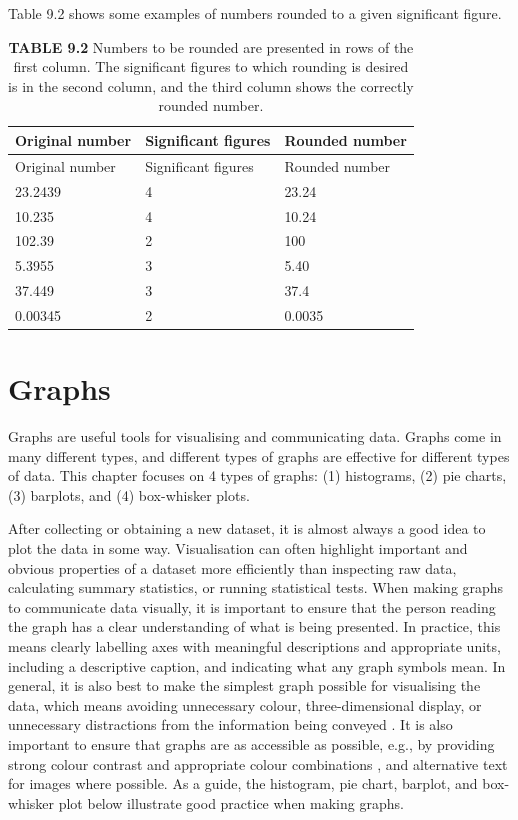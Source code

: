 \documentclass[
  openany]{krantz}
\begin{document}
Table 9.2 shows some examples of numbers rounded to a given significant figure.

\begin{longtable}[]{@{}lll@{}}
\caption{\textbf{TABLE 9.2} Numbers to be rounded are presented in rows of the first column. The significant figures to which rounding is desired is in the second column, and the third column shows the correctly rounded number.}\tabularnewline
\toprule
Original number & Significant figures & Rounded number \\
\midrule
\endfirsthead
\toprule
Original number & Significant figures & Rounded number \\
\midrule
\endhead
23.2439 & 4 & 23.24 \\
10.235 & 4 & 10.24 \\
102.39 & 2 & 100 \\
5.3955 & 3 & 5.40 \\
37.449 & 3 & 37.4 \\
0.00345 & 2 & 0.0035 \\
\bottomrule
\end{longtable}

\hypertarget{Chapter_10}{%
\chapter{Graphs}\label{Chapter_10}}

Graphs are useful tools for visualising and communicating data.
Graphs come in many different types, and different types of graphs are effective for different types of data.
This chapter focuses on 4 types of graphs: (1) histograms, (2) pie charts, (3) barplots, and (4) box-whisker plots.

After collecting or obtaining a new dataset, it is almost always a good idea to plot the data in some way.
Visualisation can often highlight important and obvious properties of a dataset more efficiently than inspecting raw data, calculating summary statistics, or running statistical tests.
When making graphs to communicate data visually, it is important to ensure that the person reading the graph has a clear understanding of what is being presented.
In practice, this means clearly labelling axes with meaningful descriptions and appropriate units, including a descriptive caption, and indicating what any graph symbols mean.
In general, it is also best to make the simplest graph possible for visualising the data, which means avoiding unnecessary colour, three-dimensional display, or unnecessary distractions from the information being conveyed \citep{Dytham2011, Kelleher2011}.
It is also important to ensure that graphs are as accessible as possible, e.g., by providing strong colour contrast and appropriate colour combinations \citep{Elavsky2022}, and alternative text for images where possible.
As a guide, the histogram, pie chart, barplot, and box-whisker plot below illustrate good practice when making graphs.
\end{document}
